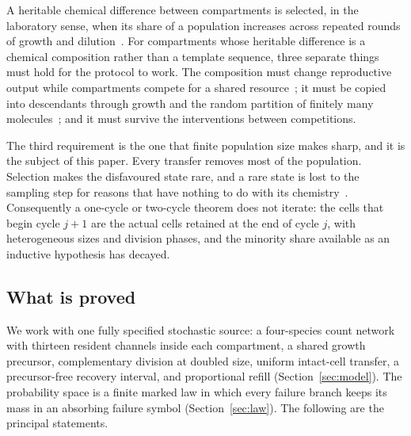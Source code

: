 \documentclass[11pt,a4paper]{article}
\theoremstyle{plain}
\theoremstyle{definition}
\theoremstyle{remark}
\begin{document}
A heritable chemical difference between compartments is selected, in the
laboratory sense, when its share of a population increases across repeated
rounds of growth and dilution~\citep{mills1967,lincoln2009,lenski1991}. For
compartments whose heritable difference is a chemical composition rather than a
template sequence, three separate things must hold for the protocol to work.
The composition must change reproductive output while compartments compete for
a shared resource~\citep{chen2004,adamala2013,lu2024,zwicker2017}; it must be
copied into descendants through growth and the random partition of finitely
many molecules~\citep{segre2000,vasas2010,virgo2015}; and it must survive the
interventions between competitions.

The third requirement is the one that finite population size makes sharp, and
it is the subject of this paper. Every transfer removes most of the population.
Selection makes the disfavoured state rare, and a rare state is lost to the
sampling step for reasons that have nothing to do with its
chemistry~\citep{wahl2001,wahl2002}. Consequently a one-cycle or two-cycle
theorem does not iterate: the cells that begin cycle $j+1$ are the actual cells
retained at the end of cycle $j$, with heterogeneous sizes and division phases,
and the minority share available as an inductive hypothesis has decayed.

\subsection{What is proved}

We work with one fully specified stochastic source: a four-species count
network with thirteen resident channels inside each compartment, a shared
growth precursor, complementary division at doubled size, uniform intact-cell
transfer, a precursor-free recovery interval, and proportional refill
(Section~\ref{sec:model}). The probability space is a finite marked law in
which every failure branch keeps its mass in an absorbing failure symbol
(Section~\ref{sec:law}). The following are the principal statements.
\end{document}
